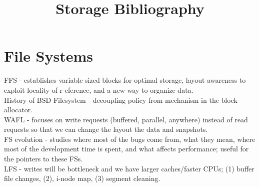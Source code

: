 \documentclass{article}
\begin{document}
\title{ Storage Bibliography }

\maketitle

%
%
%
%

\section{File Systems}

\noindent\cite{mckusick:acm1984-FFS} FFS - establishes variable sized blocks for optimal storage, layout awareness to exploit locality of r eference, and a new way to organize data.\\

\noindent\cite{mckusick:fast2015-FFS} History of BSD Filesystem - decoupling policy from mechanism in the block allocator. \\

\noindent\cite{hitz:wtec1994-WAFL} WAFL - focuses on write requests (buffered, parallel, anywhere) instead of read requests so that we can change the layout the data and snapshots.\\

\noindent\cite{lanyue:fast2013-FS-evolution} FS evolution - studies where most of the bugs come from, what they mean, where most of the development time is spent, and what affects performance; useful for the pointers to these FSs.\\

\noindent\cite{rosenblum:acm1992-LFS} LFS - writes will be bottleneck and we have larger caches/faster CPUs; (1) buffer file changes, (2), i-node map, (3) segment cleaning.\\
\end{document}
